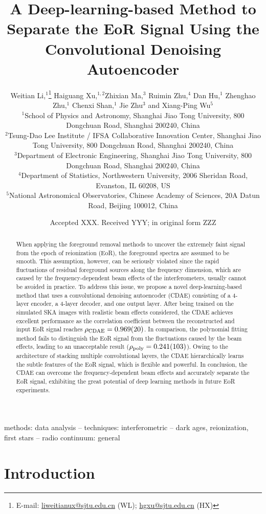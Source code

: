 \documentclass[letters,fleqn,usenatbib,onecolumn]{mnras}
\title[EoR Separation with CDAE]{%
  A Deep-learning-based Method to Separate the EoR Signal
  Using the Convolutional Denoising Autoencoder
}
\author[Li~et~al.]{%
Weitian Li,$^{1}$\thanks{E-mail:
  \href{mailto:liweitianux@sjtu.edu.cn}{liweitianux@sjtu.edu.cn} (WL);
  \href{mailto:hgxu@sjtu.edu.cn}{hgxu@sjtu.edu.cn} (HX)}
Haiguang Xu,$^{1,2}$\footnotemark[1]
Zhixian Ma,$^{3}$
Ruimin Zhu,$^{4}$
Dan Hu,$^{1}$
Zhenghao Zhu,$^{1}$
\newauthor  %
Chenxi Shan,$^{1}$
Jie Zhu$^{3}$
and
Xiang-Ping Wu$^{5}$
\\
$^{1}${School of Physics and Astronomy,
  Shanghai Jiao Tong University,
  800 Dongchuan Road, Shanghai 200240, China} \\
$^{2}${Tsung-Dao Lee Institute / IFSA Collaborative Innovation Center,
  Shanghai Jiao Tong University,
  800 Dongchuan Road, Shanghai 200240, China} \\
$^{3}${Department of Electronic Engineering,
  Shanghai Jiao Tong University,
  800 Dongchuan Road, Shanghai 200240, China} \\
$^{4}${Department of Statistics,
  Northwestern University,
  2006 Sheridan Road, Evanston, IL 60208, US} \\
$^{5}${National Astronomical Observatories,
  Chinese Academy of Sciences,
  20A Datun Road, Beijing 100012, China}
}
\date{Accepted XXX. Received YYY; in original form ZZZ}
\newcommand{\R}[1]{\mathrm{#1}}
\begin{document}
\label{firstpage}
\pagerange{\pageref{firstpage}--\pageref{lastpage}}
\maketitle

%
%
\begin{abstract}
When applying the foreground removal methods to uncover the extremely
faint signal from the epoch of reionization (EoR), the foreground spectra
are assumed to be smooth.
This assumption, however, can be seriously violated since the rapid
fluctuations of residual foreground sources along the frequency
dimension, which are caused by the frequency-dependent beam effects of
the interferometers, usually cannot be avoided in practice.
To address this issue, we propose a novel deep-learning-based method
that uses a convolutional denoising autoencoder (CDAE) consisting of
a 4-layer encoder, a 4-layer decoder, and one output layer.
After being trained on the simulated SKA images with realistic beam
effects considered,
the CDAE achieves excellent performance as the correlation coefficient
between the reconstructed and input EoR signal reaches
$\rho_{\R{CDAE}} = \num{0.969 +- 0.020}$.
In comparison, the polynomial fitting method fails to distinguish the
EoR signal from the fluctuations caused by the beam effects, leading to
an unacceptable result ($\rho_{\R{poly}} = \num{0.241 +- 0.103}$).
{\color{cyan}%
Owing to the architecture of stacking multiple convolutional layers,
the CDAE hierarchically learns the subtle features of the EoR signal,
which is flexible and powerful.
In conclusion, the CDAE can overcome the frequency-dependent beam effects
and accurately separate the EoR signal, exhibiting the great potential
of deep learning methods in future EoR experiments.} %
\end{abstract}

\begin{keywords}
methods: data analysis --
techniques: interferometric --
dark ages, reionization, first stars --
radio continuum: general
\end{keywords}



\section{Introduction}
\label{sec:intro}
\end{document}
